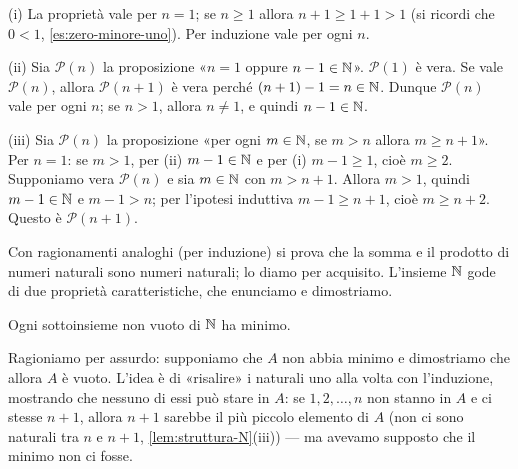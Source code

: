 \begin{dimostrazione}
(i) La proprietà vale per $n=1$; se $n\ge1$ allora $n+1\ge1+1>1$ (si ricordi che $0<1$,
\cref{es:zero-minore-uno}). Per induzione vale per ogni $n$.

(ii) Sia $\mathcal{P}(n)$ la proposizione «$n=1$ oppure $n-1\in\mathbb{N}$». $\mathcal{P}(1)$ è
vera. Se vale $\mathcal{P}(n)$, allora $\mathcal{P}(n+1)$ è vera perché
$(n+1)-1=n\in\mathbb{N}$. Dunque $\mathcal{P}(n)$ vale per ogni $n$; se $n>1$, allora $n\neq1$, e
quindi $n-1\in\mathbb{N}$.

(iii) Sia $\mathcal{P}(n)$ la proposizione «per ogni $m\in\mathbb{N}$, se $m>n$ allora
$m\ge n+1$». Per $n=1$: se $m>1$, per (ii) $m-1\in\mathbb{N}$ e per (i) $m-1\ge1$, cioè $m\ge2$.
Supponiamo vera $\mathcal{P}(n)$ e sia $m\in\mathbb{N}$ con $m>n+1$. Allora $m>1$, quindi
$m-1\in\mathbb{N}$ e $m-1>n$; per l'ipotesi induttiva $m-1\ge n+1$, cioè $m\ge n+2$. Questo è
$\mathcal{P}(n+1)$.
\end{dimostrazione}

Con ragionamenti analoghi (per induzione) si prova che la somma e il prodotto di numeri
naturali sono numeri naturali; lo diamo per acquisito. L'insieme $\mathbb{N}$ gode di due
proprietà caratteristiche, che enunciamo e dimostriamo.

\begin{teorema}\label{teo:buon-ordinamento}
Ogni sottoinsieme non vuoto di $\mathbb{N}$ ha minimo.
\end{teorema}

\begin{schema}
\end{schema}

\begin{strategia}
Ragioniamo per assurdo: supponiamo che $A$ non abbia minimo e dimostriamo che allora $A$ è
vuoto. L'idea è di «risalire» i naturali uno alla volta con l'induzione, mostrando che
nessuno di essi può stare in $A$: se $1,2,\dots,n$ non stanno in $A$ e ci stesse $n+1$,
allora $n+1$ sarebbe il più piccolo elemento di $A$ (non ci sono naturali tra $n$ e
$n+1$, \cref{lem:struttura-N}(iii)) --- ma avevamo supposto che il minimo non ci fosse.
\end{strategia}

